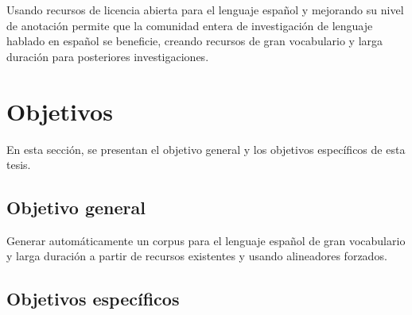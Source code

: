 Usando recursos de licencia abierta para el lenguaje español y mejorando su nivel de anotación permite que la comunidad entera de investigación de lenguaje hablado en español se beneficie, creando recursos de gran vocabulario y larga duración para posteriores investigaciones.

\section{Objetivos}

En esta sección, se presentan el objetivo general y los objetivos específicos de esta tesis.

\subsection{Objetivo general}

Generar automáticamente un corpus para el lenguaje español de gran vocabulario y larga duración a partir de recursos existentes y usando alineadores forzados.

\subsection{Objetivos específicos}

